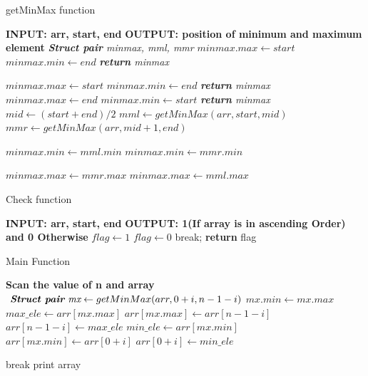 \documentclass[conference]{IEEEtran}
\begin{document}
 

\begin{algorithm}[H]
\caption{getMinMax function}
\end{algorithm}
\begin{algorithmic}[1]
\STATE \textbf{INPUT: arr, start, end}
\STATE \textbf{OUTPUT: position of minimum and maximum element}
\STATE \textit{\textbf{Struct pair} minmax, mml, mmr} 
	\STATE $minmax.max \gets start$
    \STATE $minmax.min \gets end$
	\STATE \textit{\textbf{return} minmax}
\ENDIF

    	\STATE $minmax.max \gets start$
        \STATE $minmax.min \gets end$
        \STATE \textit{\textbf{return} minmax}
     \ELSE
    	\STATE $minmax.max \gets end$
        \STATE $minmax.min \gets start$
        \STATE \textit{\textbf{return} minmax}
     \ENDIF
\ENDIF
\STATE $mid \gets (start+end)/2$
\STATE $ mml \gets getMinMax(arr,start,mid) $
\STATE $ mmr \gets getMinMax(arr,mid+1,end) $

	\STATE $minmax.min \gets mml.min$
\ELSE
	\STATE $minmax.min \gets mmr.min$
\ENDIF

	\STATE $minmax.max \gets mmr.max$
\ELSE
	\STATE $minmax.max \gets mml.max$
\ENDIF
\end{algorithmic}


\begin{algorithm}[H]
\caption{Check function}
\end{algorithm}
\begin{algorithmic}[1]
\STATE \textbf{INPUT: arr, start, end}
\STATE \textbf{OUTPUT: 1(If array is in ascending Order) and 0 Otherwise}
\STATE $flag \gets 1$
    	\STATE $ flag \gets 0$
        \STATE break;
    \ENDIF
\ENDFOR
\STATE \textbf{return} flag
\end{algorithmic}


\begin{algorithm}[H]
\caption{Main Function}
\end{algorithm}
\begin{algorithmic}[1]
\STATE \textbf{Scan the value of n and array}
     	\STATE $ \textit{ \textbf{Struct pair} mx} \gets getMinMax(arr,0+i,n-1-i) $
				\STATE $ mx.min \gets mx.max$
        \ENDIF
		\STATE $max\_ele \gets arr[mx.max]$
		\STATE $arr[mx.max] \gets arr[n-1-i]$
		\STATE $arr[n-1-i] \gets max\_ele$
		\STATE $min\_ele \gets arr[mx.min]$
		\STATE $arr[mx.min] \gets arr[0+i]$
		\STATE $arr[0+i] \gets min\_ele $
        
    \ELSE
    	\STATE break
    \ENDIF
\ENDFOR
\STATE print array
\end{algorithmic}
\end{document}
